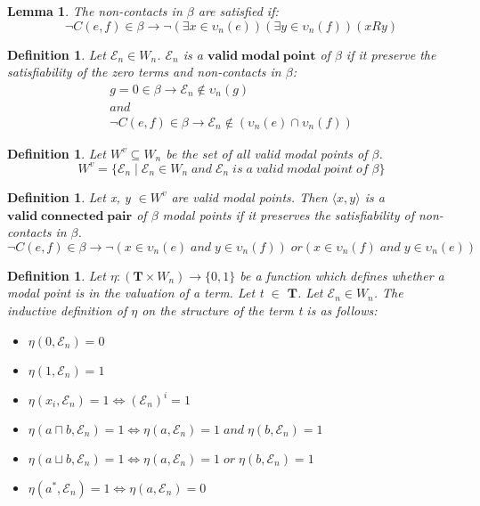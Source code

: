 \documentclass{article}
\newcommand\E{\mathcal{E}}
\newcommand\Tb{\mathbf{T}}
\newtheorem{lemma}[theorem]{Lemma}
\newtheorem{defn}[theorem]{Definition}
\newcommand{\pair}[2]{ \langle #1, #2 \rangle }
\newcommand{\pairXY}{ \pair{x}{y} }
\begin{document}
		\begin{lemma}
			The non-contacts in $\beta$ are satisfied if:
			\begin{equation}
				\neg C(e, f) \in \beta \rightarrow \neg(\exists x \in \upsilon_n(e))(\exists y \in \upsilon_n(f))(xRy)
			\end{equation}
		\end{lemma}

		\begin{defn}
			Let $\E_n \in W_n$. $\E_n$ is a $\mathbf{valid \; modal \; point}$ of $\beta$ if it preserve the satisfiability of the zero terms and non-contacts in $\beta$:
			\begin{gather*}
				g = 0 \in \beta \rightarrow \E_n \notin \upsilon_n(g) \\ and \\
				\neg C(e, f) \in \beta \rightarrow \E_n \notin (\upsilon_n(e) \cap \upsilon_n(f))
			\end{gather*}
		\end{defn}

		\begin{defn}\label{set-all-valid-modal-points}
			Let $W^v \subseteq W_n$ be the set of all valid modal points of $\beta$.
			\begin{equation}
				W^v = \{ \E_n \mid \E_n \in W_n \; and \; \E_n \; is \; a \; valid \; modal \; point \; of \; \beta \}
			\end{equation}
		\end{defn}

		\begin{defn}
			Let x, y $\in W^v$ are valid modal points. Then $\pairXY$ is a $\mathbf{valid \; connected \; pair}$ of $\beta$ modal points if it preserves the satisfiability of non-contacts in $\beta$.
			\begin{equation}
			\neg C(e, f) \in \beta \rightarrow
			\neg(x \in \upsilon_n(e) \; and \; y \in \upsilon_n(f)) \;  or
			(x \in \upsilon_n(f) \; and \; y \in \upsilon_n(e)) \;
			\end{equation}
		\end{defn}

		\begin{defn}
			\label{eta-valuation}
			Let $\eta: (\Tb \times W_n) \rightarrow \{0, 1 \}$ be a function which defines whether a modal point is in the valuation of a term. Let t $\in$ $\Tb$. Let $\E_n \in W_n$. The inductive definition of $\eta$ on the structure of the term t is as follows:
			\begin{itemize}
				\item $\eta(0, \E_n) = 0$
				\item $\eta(1, \E_n) = 1$
				\item $\eta(x_i, \E_n) = 1 \iff (\E_n)^i = 1$
				\item $\eta(a \sqcap b, \E_n) = 1 \iff \eta(a, \E_n) = 1 \; and \; \eta(b, \E_n) = 1$
				\item $\eta(a \sqcup b, \E_n) = 1 \iff \eta(a, \E_n) = 1 \; or \; \eta(b, \E_n) = 1$
				\item $\eta(a^*, \E_n) = 1 \iff \eta(a, \E_n) = 0$
			\end{itemize}
		\end{defn}
\end{document}
